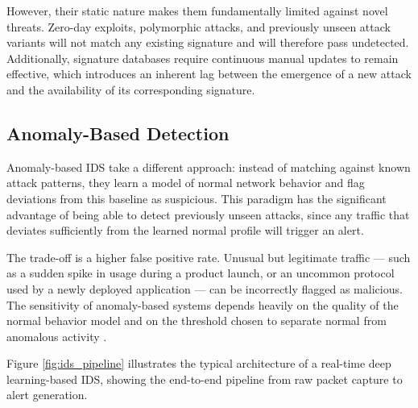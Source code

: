 \par However, their static nature makes them fundamentally limited against novel threats. Zero-day exploits, polymorphic attacks, and previously unseen attack variants will not match any existing signature and will therefore pass undetected. Additionally, signature databases require continuous manual updates to remain effective, which introduces an inherent lag between the emergence of a new attack and the availability of its corresponding signature.

\subsection{Anomaly-Based Detection}
\label{subsec:anomaly_ids}

\par Anomaly-based IDS take a different approach: instead of matching against known attack patterns, they learn a model of normal network behavior and flag deviations from this baseline as suspicious. This paradigm has the significant advantage of being able to detect previously unseen attacks, since any traffic that deviates sufficiently from the learned normal profile will trigger an alert.

\par The trade-off is a higher false positive rate. Unusual but legitimate traffic --- such as a sudden spike in usage during a product launch, or an uncommon protocol used by a newly deployed application --- can be incorrectly flagged as malicious. The sensitivity of anomaly-based systems depends heavily on the quality of the normal behavior model and on the threshold chosen to separate normal from anomalous activity \cite{Zhang2025}.

\par Figure \ref{fig:ids_pipeline} illustrates the typical architecture of a real-time deep learning-based IDS, showing the end-to-end pipeline from raw packet capture to alert generation.

